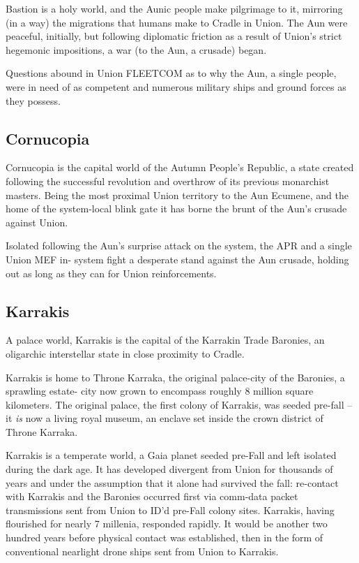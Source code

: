 Bastion is a holy world, and the Aunic people make pilgrimage to it, mirroring (in a way) the
migrations that humans make to Cradle in Union. The Aun were peaceful, initially, but following
diplomatic friction as a result of Union’s strict hegemonic impositions, a war (to the Aun, a
crusade) began.

Questions abound in Union FLEETCOM as to why the Aun, a single people, were in need of as
competent and numerous military ships and ground forces as they possess.

\subsection{Cornucopia}

Cornucopia is the capital world of the Autumn People’s Republic, a state created following the
successful revolution and overthrow of its previous monarchist masters. Being the most proximal
Union territory to the Aun Ecumene, and the home of the system-local blink gate it has borne the
brunt of the Aun’s crusade against Union.

Isolated following the Aun’s surprise attack on the system, the APR and a single Union MEF in-
system fight a desperate stand against the Aun crusade, holding out as long as they can for
Union reinforcements.

\subsection{Karrakis}

A palace world, Karrakis is the capital of the Karrakin Trade Baronies, an oligarchic interstellar
state in close proximity to Cradle.

Karrakis is home to Throne Karraka, the original palace-city of the Baronies, a sprawling estate-
city now grown to encompass roughly 8 million square kilometers. The original palace, the first
colony of Karrakis, was seeded pre-fall -- it \textit{is} now a living royal museum, an enclave set inside
the crown district of Throne Karraka.

Karrakis is a temperate world, a Gaia planet seeded pre-Fall and left isolated during the dark age.
It has developed divergent from Union for thousands of years and under the assumption that it
alone had survived the fall: re-contact with Karrakis and the Baronies occurred first via comm-data
packet transmissions sent from Union to ID’d pre-Fall colony sites. Karrakis, having flourished for
nearly 7 millenia, responded rapidly. It would be another two hundred years before physical
contact was established, then in the form of conventional nearlight drone ships sent from Union to
Karrakis.

